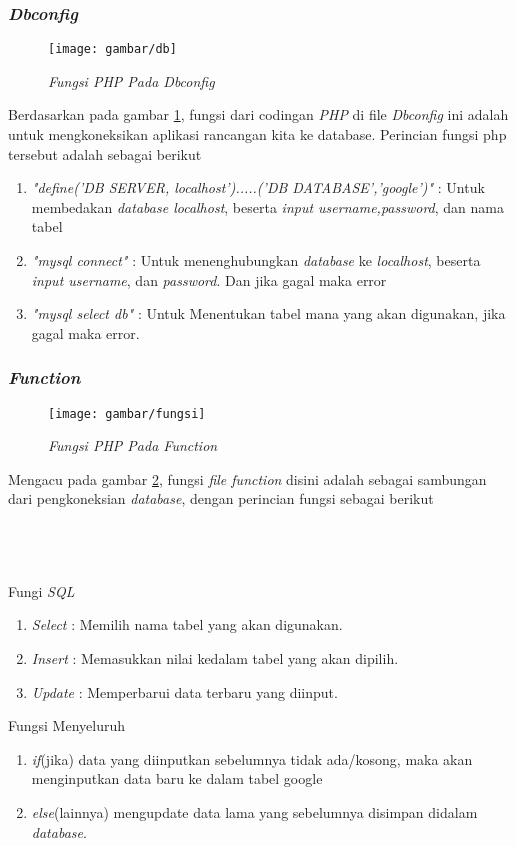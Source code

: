 \subsubsection{\textit{Dbconfig}}
\begin{figure}[!htbp]
    \centering
    \texttt{[image: gambar/db]}
    \caption{\textit{Fungsi \textit{PHP} Pada \textit{Dbconfig}}}
    \label{dbconfig}
\end{figure}
\par 
Berdasarkan pada gambar \ref{dbconfig}, fungsi dari codingan \textit{PHP} di file \textit{Dbconfig} ini adalah untuk mengkoneksikan aplikasi rancangan kita ke database. Perincian fungsi php tersebut adalah sebagai berikut
\begin{enumerate}
\item \textit{"define('DB SERVER, localhost').....('DB DATABASE','google')"} : Untuk membedakan \textit{database localhost}, beserta \textit{input username,password}, dan nama tabel
\item \textit{"mysql connect"} : Untuk menenghubungkan \textit{database} ke \textit{localhost}, beserta \textit{input username}, dan \textit{password}. Dan jika gagal maka error
\item \textit{"mysql select db"} : Untuk Menentukan tabel mana yang akan digunakan, jika gagal maka error.
\end{enumerate}


\subsubsection{\textit{Function}}
\begin{figure}[!htbp]
    \centering
    \texttt{[image: gambar/fungsi]}
    \caption{\textit{Fungsi \textit{PHP} Pada \textit{Function}}}
    \label{fungsi}
\end{figure}
\par
Mengacu pada gambar \ref{fungsi}, fungsi \textit{file function} disini adalah sebagai sambungan dari pengkoneksian \textit{database}, dengan perincian fungsi sebagai berikut
\\
\\
\\
\\
\par
Fungi \textit{SQL}
\begin{enumerate}
\item \textit{Select} : Memilih nama tabel yang akan digunakan.
\item \textit{Insert} : Memasukkan nilai kedalam tabel yang akan dipilih.
\item \textit{Update} : Memperbarui data terbaru yang diinput.
\end{enumerate}
\par 
Fungsi Menyeluruh
\begin{enumerate}
\item \textit{if}(jika) data yang diinputkan sebelumnya tidak ada/kosong, maka akan menginputkan data baru ke dalam tabel google
\item \textit{else}(lainnya) mengupdate data lama yang sebelumnya disimpan didalam \textit{database}.
\end{enumerate}


